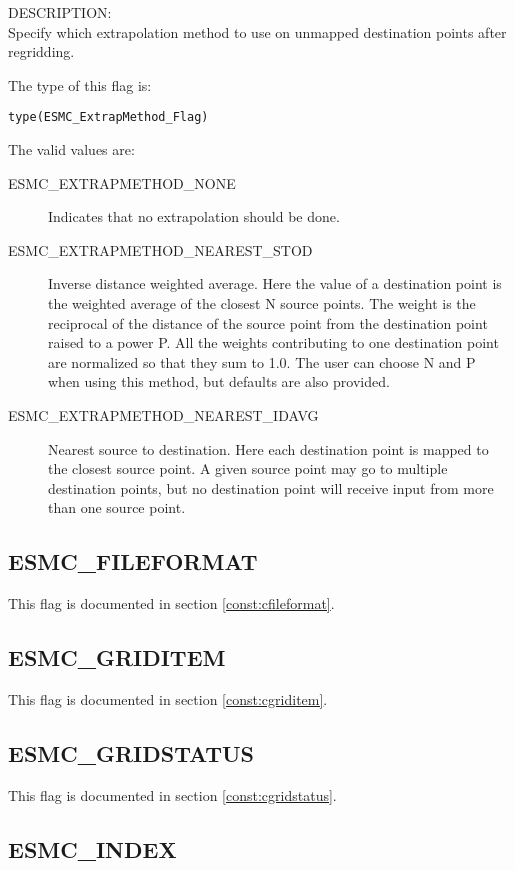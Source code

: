 {\sf DESCRIPTION:\\}
Specify which extrapolation method to use on unmapped destination points after 
regridding.

The type of this flag is:

{\tt type(ESMC\_ExtrapMethod\_Flag)}

The valid values are:
\begin{description}
\item [ESMC\_EXTRAPMETHOD\_NONE]
      Indicates that no extrapolation should be done. 
\item [ESMC\_EXTRAPMETHOD\_NEAREST\_STOD]
      Inverse distance weighted average. 
      Here the value of a destination point is the weighted average of the 
      closest N source points. The weight is the reciprocal of the distance of 
      the source point from the destination point raised to a power P. All the
      weights contributing to one destination point are normalized so that they 
      sum to 1.0. The user can choose N and P when using this method, but 
      defaults are also provided.  
\item [ESMC\_EXTRAPMETHOD\_NEAREST\_IDAVG]
      Nearest source to destination. 
      Here each destination point is mapped to the closest source point. A given 
      source point may go to multiple destination points, but no destination 
      point will receive input from more than one source point. 
\end{description}

\subsection{ESMC\_FILEFORMAT}
This flag is documented in section \ref{const:cfileformat}.

\subsection{ESMC\_GRIDITEM}
This flag is documented in section \ref{const:cgriditem}.

\subsection{ESMC\_GRIDSTATUS}
This flag is documented in section \ref{const:cgridstatus}.

\subsection{ESMC\_INDEX}
\label{const:indexflag}

